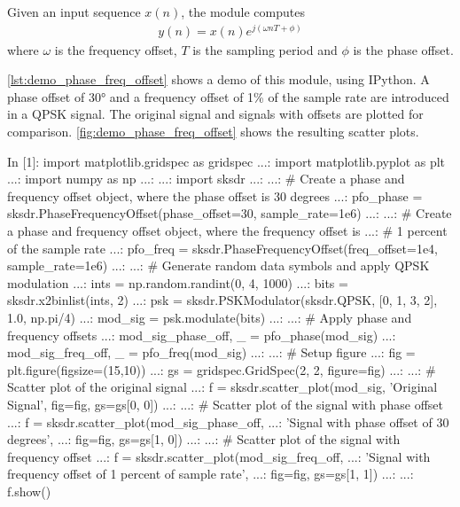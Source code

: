 Given an input sequence $x(n)$, the module computes
\begin{align}
  y(n) = x(n)e^{j(\omega nT + \phi)}
\end{align}
where $\omega$ is the frequency offset, $T$ is the sampling period and $\phi$ is the phase offset.

\autoref{lst:demo_phase_freq_offset} shows a demo of this module, using IPython. A phase offset of 30° and a frequency offset of 1\% of the sample rate are introduced in a QPSK signal. The original signal and signals with offsets are plotted for comparison. \autoref{fig:demo_phase_freq_offset} shows the resulting scatter plots.

\begin{python}[label={lst:demo_phase_freq_offset},caption={\code{PhaseFrequencyOffset} demo}]
  In [1]: import matplotlib.gridspec as gridspec
  ...: import matplotlib.pyplot as plt
  ...: import numpy as np
  ...:
  ...: import sksdr
  ...:
  ...: # Create a phase and frequency offset object, where the phase offset is 30 degrees
  ...: pfo_phase = sksdr.PhaseFrequencyOffset(phase_offset=30, sample_rate=1e6)
  ...:
  ...: # Create a phase and frequency offset object, where the frequency offset is
  ...: # 1 percent of the sample rate
  ...: pfo_freq = sksdr.PhaseFrequencyOffset(freq_offset=1e4, sample_rate=1e6)
  ...:
  ...: # Generate random data symbols and apply QPSK modulation
  ...: ints = np.random.randint(0, 4, 1000)
  ...: bits = sksdr.x2binlist(ints, 2)
  ...: psk = sksdr.PSKModulator(sksdr.QPSK, [0, 1, 3, 2], 1.0, np.pi/4)
  ...: mod_sig = psk.modulate(bits)
  ...:
  ...: # Apply phase and frequency offsets
  ...: mod_sig_phase_off, _ = pfo_phase(mod_sig)
  ...: mod_sig_freq_off, _ = pfo_freq(mod_sig)
  ...:
  ...: # Setup figure
  ...: fig = plt.figure(figsize=(15,10))
  ...: gs = gridspec.GridSpec(2, 2, figure=fig)
  ...:
  ...: # Scatter plot of the original signal
  ...: f = sksdr.scatter_plot(mod_sig, 'Original Signal', fig=fig, gs=gs[0, 0])
  ...:
  ...: # Scatter plot of the signal with phase offset
  ...: f = sksdr.scatter_plot(mod_sig_phase_off,
  ...:                        'Signal with phase offset of 30 degrees',
  ...:                        fig=fig, gs=gs[1, 0])
  ...:
  ...: # Scatter plot of the signal with frequency offset
  ...: f = sksdr.scatter_plot(mod_sig_freq_off,
  ...:                       'Signal with frequency offset of 1 percent of sample rate',
  ...:                       fig=fig, gs=gs[1, 1])
  ...:
  ...: f.show()
\end{python}

